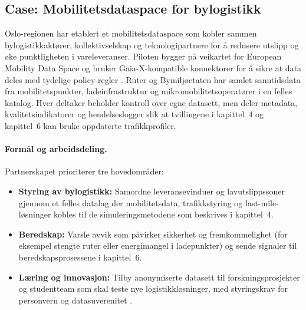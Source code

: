 \subsection{Case: Mobilitetsdataspace for bylogistikk}
Oslo-regionen har etablert et mobilitetsdataspace som kobler sammen bylogistikkaktører, kollektivselskap og teknologipartnere
for å redusere utslipp og øke punktligheten i vareleveranser. Piloten bygger på veikartet for European Mobility Data Space og
bruker Gaia-X-kompatible konnektorer for å sikre at data deles med tydelige policy-regler \citep{ec2023mobilitydataspaceblueprint}.
Ruter og Bymiljøetaten har samlet sanntidsdata fra mobilitetspunkter, ladeinfrastruktur og mikromobilitetsoperatører i en
felles katalog. Hver deltaker beholder kontroll over egne datasett, men deler metadata, kvalitetsindikatorer og hendelseslogger
slik at tvillingene i kapittel~4 og kapittel~6 kan bruke oppdaterte trafikkprofiler.

\paragraph{Formål og arbeidsdeling.} Partnerskapet prioriterer tre hovedområder:
\begin{itemize}
    \item \textbf{Styring av bylogistikk:} Samordne leveransevinduer og lavutslippssoner gjennom et felles datalag der
    mobilitetsdata, trafikkstyring og last-mile-løsninger kobles til de simuleringsmetodene som beskrives i kapittel~4.
    \item \textbf{Beredskap:} Varsle avvik som påvirker sikkerhet og fremkommelighet (for eksempel stengte ruter eller
    energimangel i ladepunkter) og sende signaler til beredskapsprosessene i kapittel~6.
    \item \textbf{Læring og innovasjon:} Tilby anonymiserte datasett til forskningsprosjekter og studentteam som skal teste nye
    logistikkløsninger, med styringskrav for personvern og datasuverenitet \citep{ruter2023dataplattform}.
\end{itemize}

